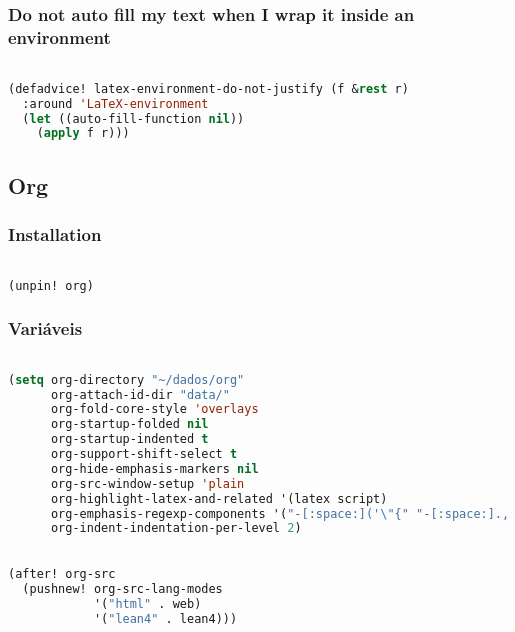 \documentclass[11pt]{article}
\begin{document}
\subsubsection{Do not auto fill my text when I wrap it inside an environment}
\label{sec:do-not-auto-fill-my-text-when-i-wrap-it-inside-an-environment}
\begin{lstlisting}[language=Lisp]%! Someone please complete this list for me

(defadvice! latex-environment-do-not-justify (f &rest r)
  :around 'LaTeX-environment
  (let ((auto-fill-function nil))
    (apply f r)))
\end{lstlisting}


\subsection{Org}
\label{sec:org}


\subsubsection{Installation}
\label{sec:installation-4}
\begin{lstlisting}[language=Lisp]%! Someone please complete this list for me

(unpin! org)
\end{lstlisting}

\subsubsection{Variáveis}
\label{sec:variaveis}
\begin{lstlisting}[language=Lisp]%! Someone please complete this list for me

(setq org-directory "~/dados/org"
      org-attach-id-dir "data/"
      org-fold-core-style 'overlays
      org-startup-folded nil
      org-startup-indented t
      org-support-shift-select t
      org-hide-emphasis-markers nil
      org-src-window-setup 'plain
      org-highlight-latex-and-related '(latex script)
      org-emphasis-regexp-components '("-[:space:]('\"{" "-[:space:].,:!?;'\")}\\[" "{}*[:space:]" "." 1)
      org-indent-indentation-per-level 2)
\end{lstlisting}

\begin{lstlisting}[language=Lisp]%! Someone please complete this list for me

(after! org-src
  (pushnew! org-src-lang-modes
            '("html" . web)
            '("lean4" . lean4)))
\end{lstlisting}
\end{document}
